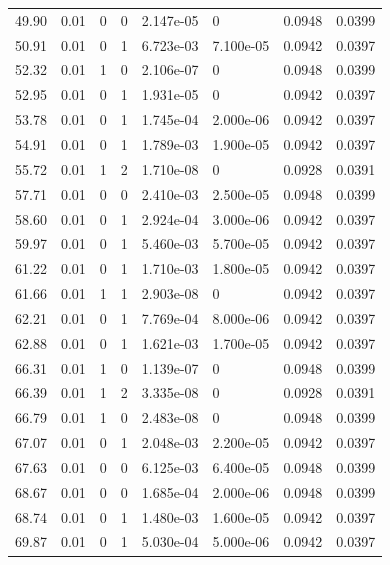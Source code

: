 \documentclass[preview]{standalone}
\begin{document}
{{{\begin{tabular}{L{1.2cm}C{1.2cm} C{0.3cm}C{0.5cm} C{1.4cm}C{1.4cm} C{1.4cm}C{1.4cm}}
  49.90  &  0.01  & 0     &  0 &  2.147e-05  & 0  & 0.0948 &  0.0399   \\ 
  50.91  &  0.01  & 0     &  1 &  6.723e-03  & 7.100e-05  & 0.0942 &  0.0397   \\ 
  52.32  &  0.01  & 1     &  0 &  2.106e-07  & 0  & 0.0948 &  0.0399   \\ 
  52.95  &  0.01  & 0     &  1 &  1.931e-05  & 0  & 0.0942 &  0.0397   \\ 
  53.78  &  0.01  & 0     &  1 &  1.745e-04  & 2.000e-06  & 0.0942 &  0.0397   \\ 
  54.91  &  0.01  & 0     &  1 &  1.789e-03  & 1.900e-05  & 0.0942 &  0.0397   \\ 
  55.72  &  0.01  & 1     &  2 &  1.710e-08  & 0  & 0.0928 &  0.0391   \\ 
  57.71  &  0.01  & 0     &  0 &  2.410e-03  & 2.500e-05  & 0.0948 &  0.0399   \\ 
  58.60  &  0.01  & 0     &  1 &  2.924e-04  & 3.000e-06  & 0.0942 &  0.0397   \\ 
  59.97  &  0.01  & 0     &  1 &  5.460e-03  & 5.700e-05  & 0.0942 &  0.0397   \\ 
  61.22  &  0.01  & 0     &  1 &  1.710e-03  & 1.800e-05  & 0.0942 &  0.0397   \\ 
  61.66  &  0.01  & 1     &  1 &  2.903e-08  & 0  & 0.0942 &  0.0397   \\ 
  62.21  &  0.01  & 0     &  1 &  7.769e-04  & 8.000e-06  & 0.0942 &  0.0397   \\ 
  62.88  &  0.01  & 0     &  1 &  1.621e-03  & 1.700e-05  & 0.0942 &  0.0397   \\ 
  66.31  &  0.01  & 1     &  0 &  1.139e-07  & 0  & 0.0948 &  0.0399   \\ 
  66.39  &  0.01  & 1     &  2 &  3.335e-08  & 0  & 0.0928 &  0.0391   \\ 
  66.79  &  0.01  & 1     &  0 &  2.483e-08  & 0  & 0.0948 &  0.0399   \\ 
  67.07  &  0.01  & 0     &  1 &  2.048e-03  & 2.200e-05  & 0.0942 &  0.0397   \\ 
  67.63  &  0.01  & 0     &  0 &  6.125e-03  & 6.400e-05  & 0.0948 &  0.0399   \\ 
  68.67  &  0.01  & 0     &  0 &  1.685e-04  & 2.000e-06  & 0.0948 &  0.0399   \\ 
  68.74  &  0.01  & 0     &  1 &  1.480e-03  & 1.600e-05  & 0.0942 &  0.0397   \\ 
  69.87  &  0.01  & 0     &  1 &  5.030e-04  & 5.000e-06  & 0.0942 &  0.0397   \\ 

\end{tabular}}}}
\end{document}

